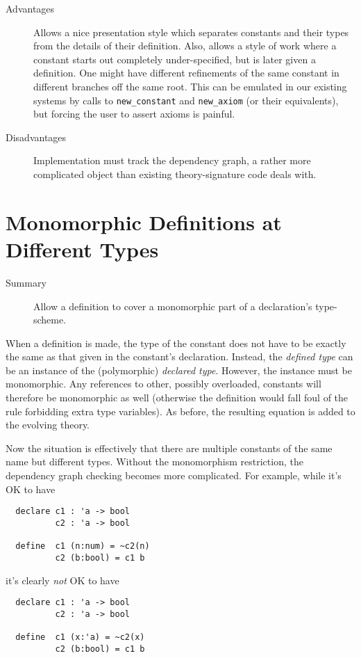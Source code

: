 \documentclass[11pt]{article}
\begin{document}
\begin{description}
\item[Advantages] Allows a nice presentation style which separates
  constants and their types from the details of their definition.
  Also, allows a style of work where a constant starts out completely
  under-specified, but is later given a definition.  One might have
  different refinements of the same constant in different branches off
  the same root.  This can be emulated in our existing systems by
  calls to \texttt{new\_constant} and \texttt{new\_axiom} (or their
  equivalents), but forcing the user to assert axioms is painful.
\item[Disadvantages] Implementation must track the dependency graph, a
  rather more complicated object than existing theory-signature code
  deals with.
\end{description}


\section{Monomorphic Definitions at Different Types}
\label{sec:defin-at-diff}

\begin{description}
\item[Summary] Allow a definition to cover a monomorphic part of a
  declaration's type-scheme.
\end{description}

When a definition is made, the type of the constant does not have to
be exactly the same as that given in the constant's declaration.
Instead, the \emph{defined type} can be an instance of the
(polymorphic) \emph{declared type}.  However, the instance must be
monomorphic.  Any references to other, possibly overloaded, constants
will therefore be monomorphic as well (otherwise the definition would
fall foul of the rule forbidding extra type variables). As before, the
resulting equation is added to the evolving theory.

Now the situation is effectively that there are multiple constants of
the same name but different types.  Without the monomorphism
restriction, the dependency graph checking becomes more complicated.
For example, while it's OK to have
\begin{verbatim}
  declare c1 : 'a -> bool
          c2 : 'a -> bool

  define  c1 (n:num) = ~c2(n)
          c2 (b:bool) = c1 b
\end{verbatim}
it's clearly \emph{not} OK to have
\begin{verbatim}
  declare c1 : 'a -> bool
          c2 : 'a -> bool

  define  c1 (x:'a) = ~c2(x)
          c2 (b:bool) = c1 b
\end{verbatim}
\end{document}
